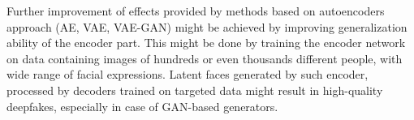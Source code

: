 Further improvement of effects provided by methods based on autoencoders approach (AE, VAE, VAE-GAN) might be achieved by improving generalization ability of the encoder part. This might be done by training the encoder network on data containing images of hundreds or even thousands different people, with wide range of facial expressions. Latent faces generated  by such encoder, processed by decoders trained on targeted data might result in high-quality deepfakes, especially in case of GAN-based generators.